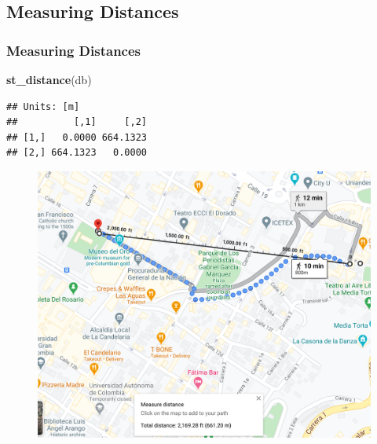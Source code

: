 \documentclass[
  shownotes,
  xcolor={svgnames},
  hyperref={colorlinks,citecolor=DarkBlue,linkcolor=DarkRed,urlcolor=DarkBlue}
   , aspectratio=169]{beamer}
\newenvironment{Shaded}{\begin{snugshade}}{\end{snugshade}}
\newcommand{\KeywordTok}[1]{\textcolor[rgb]{0.13,0.29,0.53}{\textbf{#1}}}
\newcommand{\NormalTok}[1]{#1}
\begin{document}
\subsection{Measuring Distances}
\begin{frame}[fragile]
\frametitle{Measuring Distances}

\begin{Shaded}
\begin{Highlighting}[]
\KeywordTok{st\_distance}\NormalTok{(db)}
\end{Highlighting}
\end{Shaded}
\begin{scriptsize}
\begin{verbatim}
## Units: [m]
##          [,1]     [,2]
## [1,]   0.0000 664.1323
## [2,] 664.1323   0.0000
\end{verbatim}
\end{scriptsize}

\begin{figure}[H] \centering
  \centering
\includegraphics[scale=0.25]{figures/distance_google_maps}
  \\
  \end{figure}



\end{frame}
\end{document}
